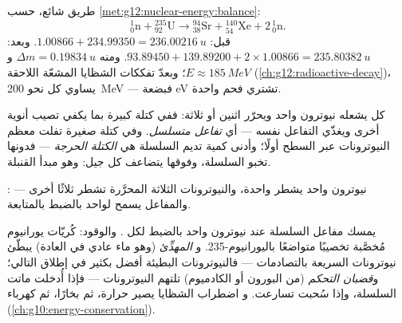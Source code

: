 \begin{example}\label{ex:g12:nuclear-energy:fissionbalance}
طريق شائع، حسب \cref{met:g12:nuclear-energy:balance}:
\[
{}^{1}_{0}\mathrm{n} + {}^{235}_{92}\mathrm{U} \longrightarrow
{}^{94}_{38}\mathrm{Sr} + {}^{140}_{54}\mathrm{Xe} + 2\,{}^{1}_{0}\mathrm{n}.
\]
قبل: $1.00866 + 234.99350 = \qty{236.00216}{u}$. وبعد:
$93.89450 + 139.89200 + 2 \times 1.00866 = \qty{235.80382}{u}$. ومنه
$\Delta m = \qty{0.19834}{u}$ و$E \approx \qty{185}{MeV}$؛ وبعدّ
تفككات الشظايا المشعّة اللاحقة (\cref{ch:g12:radioactive-decay})،
يساوي كل  نحو \qty{200}{MeV} --- فبضعة \unit{eV} تشتري 
فحم واحدة.
\end{example}

\begin{definition}\label{def:g12:nuclear-energy:chain}
كل  يشعله نيوترون واحد ويحرّر اثنين أو ثلاثة: ففي كتلة كبيرة بما يكفي
تصيب أنوية أخرى ويغذّي التفاعل نفسه ---
أي \emph{تفاعل متسلسل}. وفي كتلة صغيرة تفلت معظم النيوترونات
عبر السطح أولًا؛ وأدنى كمية تديم السلسلة
هي \emph{الكتلة الحرجة} --- فدونها تخبو السلسلة،
وفوقها يتضاعف كل جيل: وهو مبدأ القنبلة.
\end{definition}

\begin{omfigure}

{\small {}: نيوترون واحد يشطر  واحدة، والنيوترونات الثلاثة
المحرَّرة تشطر ثلاثًا أخرى --- والمفاعل يسمح لواحد بالضبط بالمتابعة.}
\end{omfigure}

\begin{definition}\label{def:g12:nuclear-energy:reactor}
يمسك مفاعل  السلسلة عند نيوترون واحد بالضبط لكل . والوقود:
كُريّات يورانيوم مُخصَّبة تخصيبًا متواضعًا باليورانيوم-235. و
\emph{المهدِّئ} (وهو ماء عادي في العادة) يبطّئ نيوترونات
 السريعة بالتصادمات --- فالنيوترونات البطيئة أفضل بكثير في إطلاق
 التالي؛ و\emph{قضبان التحكم} (من البورون أو الكادميوم)
تلتهم النيوترونات --- فإذا أُدخلت ماتت السلسلة، وإذا سُحبت تسارعت. و
اضطراب الشظايا يصير حرارة، ثم بخارًا، ثم كهرباء
(\cref{ch:g10:energy-conservation}).
\end{definition}


